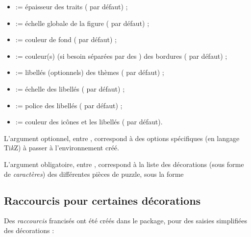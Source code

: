 \documentclass[11pt,a4paper]{ltxdoc}
\providecommand\tikzlogo{Ti\textit{k}Z}
\let\TikZ\tikzlogo
\begin{document}
\begin{itemize}
	\item {} := épaisseur des traits (\MontreCode{1pt} par défaut) ;
	\item {} := échelle globale de la figure ( par défaut) ;
	\item {} := couleur de fond ( par défaut) ;
	\item {} := couleur(s) (si besoin séparées par des \MontreCode{,}) des bordures ( par défaut) ;
	\item {} := libellés (optionnels) des thèmes ( par défaut) ;
	\item {} := échelle des libellés ( par défaut) ;
	\item {} := police des libellés ( par défaut) ;
	\item {} := couleur des icônes et les libellés ( par défaut).
\end{itemize}

\medskip

L'argument optionnel, entre , correspond à des options spécifiques (en langage \TikZ) à passer à l'environnement créé.

\smallskip

L'argument obligatoire, entre , correspond à la liste des décorations (sous forme de \textit{caractères}) des différentes pièces de puzzle, sous la forme 

\subsection{Raccourcis pour certaines décorations}

Des \textit{raccourcis} francisés ont été créés dans le package, pour des saisies simplifiées des décorations :
\end{document}
